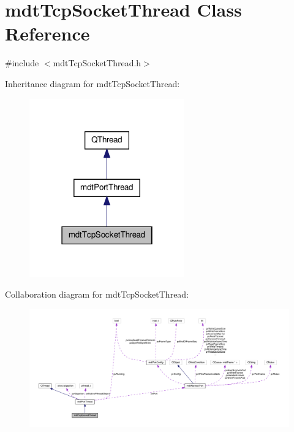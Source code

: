 \hypertarget{classmdt_tcp_socket_thread}{\section{mdt\-Tcp\-Socket\-Thread Class Reference}
\label{classmdt_tcp_socket_thread}
}


{\ttfamily \#include $<$mdt\-Tcp\-Socket\-Thread.\-h$>$}



Inheritance diagram for mdt\-Tcp\-Socket\-Thread\-:\nopagebreak
\begin{figure}[H]
\begin{center}
\leavevmode
\includegraphics[width=190pt]{classmdt_tcp_socket_thread__inherit__graph}
\end{center}
\end{figure}


Collaboration diagram for mdt\-Tcp\-Socket\-Thread\-:
\nopagebreak
\begin{figure}[H]
\begin{center}
\leavevmode
\includegraphics[width=350pt]{classmdt_tcp_socket_thread__coll__graph}
\end{center}
\end{figure}
